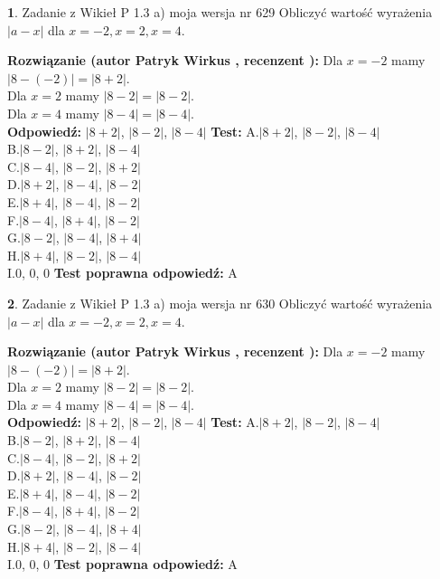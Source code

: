 \documentclass[12pt, a4paper]{article}
\theoremstyle{definition} %
\newtheorem{zad}{}
\newcommand{\zadStart}[1]{\begin{zad}#1\newline}
\newcommand{\zadStop}{\end{zad}}
\newcommand{\rozwStart}[2]{\noindent \textbf{Rozwiązanie (autor #1 , recenzent #2): }\newline}
\newcommand{\rozwStop}{\newline}
\newcommand{\odpStart}{\noindent \textbf{Odpowiedź:}\newline}
\newcommand{\odpStop}{\newline}
\newcommand{\testStart}{\noindent \textbf{Test:}\newline}
\newcommand{\testStop}{\newline}
\newcommand{\kluczStart}{\noindent \textbf{Test poprawna odpowiedź:}\newline}
\newcommand{\kluczStop}{\newline}
\begin{document}
\zadStart{Zadanie z Wikieł P 1.3 a) moja wersja nr 629}
Obliczyć wartość wyrażenia $|a - x|$ dla $x=-2,x=2,x=4$.
\zadStop
\rozwStart{Patryk Wirkus}{}
Dla $x = -2$ mamy $|8 - (-2)| = |8 + 2|$.\\
Dla $x = 2$ mamy $|8 - 2| = |8 - 2|$.\\
Dla $x = 4$ mamy $|8 - 4| = |8 - 4|$.\\
\rozwStop
\odpStart
$|8 + 2|$, $|8 - 2|$, $|8 - 4|$
\odpStop
\testStart
A.$|8 + 2|$, $|8 - 2|$, $|8 - 4|$\\
B.$|8 - 2|$, $|8 + 2|$, $|8 - 4|$\\
C.$|8 - 4|$, $|8 - 2|$, $|8 + 2|$\\
D.$|8 + 2|$, $|8 - 4|$, $|8 - 2|$\\
E.$|8 + 4|$, $|8 - 4|$, $|8 - 2|$\\
F.$|8 - 4|$, $|8 + 4|$, $|8 - 2|$\\
G.$|8 - 2|$, $|8 - 4|$, $|8 + 4|$\\
H.$|8 + 4|$, $|8 - 2|$, $|8 - 4|$\\
I.$0$, $0$, $0$
\testStop
\kluczStart
A
\kluczStop



\zadStart{Zadanie z Wikieł P 1.3 a) moja wersja nr 630}
Obliczyć wartość wyrażenia $|a - x|$ dla $x=-2,x=2,x=4$.
\zadStop
\rozwStart{Patryk Wirkus}{}
Dla $x = -2$ mamy $|8 - (-2)| = |8 + 2|$.\\
Dla $x = 2$ mamy $|8 - 2| = |8 - 2|$.\\
Dla $x = 4$ mamy $|8 - 4| = |8 - 4|$.\\
\rozwStop
\odpStart
$|8 + 2|$, $|8 - 2|$, $|8 - 4|$
\odpStop
\testStart
A.$|8 + 2|$, $|8 - 2|$, $|8 - 4|$\\
B.$|8 - 2|$, $|8 + 2|$, $|8 - 4|$\\
C.$|8 - 4|$, $|8 - 2|$, $|8 + 2|$\\
D.$|8 + 2|$, $|8 - 4|$, $|8 - 2|$\\
E.$|8 + 4|$, $|8 - 4|$, $|8 - 2|$\\
F.$|8 - 4|$, $|8 + 4|$, $|8 - 2|$\\
G.$|8 - 2|$, $|8 - 4|$, $|8 + 4|$\\
H.$|8 + 4|$, $|8 - 2|$, $|8 - 4|$\\
I.$0$, $0$, $0$
\testStop
\kluczStart
A
\kluczStop
\end{document}
